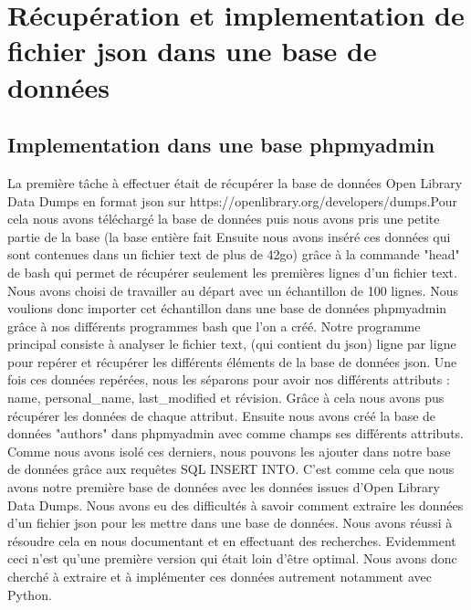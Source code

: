 \documentclass[12pt, a4paper]{article}
\begin{document}
\section{Récupération et implementation de fichier json dans une base de données}
\subsection{Implementation dans une base phpmyadmin}
La première tâche à effectuer était de récupérer la base de données Open Library Data Dumps en format json sur https://openlibrary.org/developers/dumps.Pour cela nous avons téléchargé la base de données puis nous avons pris une petite partie de la base (la base entière fait Ensuite nous avons inséré ces données qui sont contenues dans un fichier text de plus de 42go) grâce à la commande "head" de bash qui permet de récupérer seulement les premières lignes d'un fichier text. Nous avons choisi de travailler au départ avec un échantillon de 100 lignes. Nous voulions donc importer cet échantillon dans une base de données phpmyadmin grâce à nos différents programmes bash que l'on a créé.
Notre programme principal consiste à analyser le fichier text, (qui contient du json) ligne par ligne pour repérer et récupérer les différents éléments de la base de données json. Une fois ces données repérées, nous les séparons pour avoir nos différents attributs : name, personal\_name, last\_modified et révision. Grâce à cela nous avons pus récupérer les données de chaque attribut. Ensuite nous avons créé la base de données "authors" dans phpmyadmin avec comme champs ses différents attributs. Comme nous avons isolé ces derniers, nous pouvons les ajouter dans notre base de données grâce aux requêtes SQL INSERT INTO. C'est comme cela que nous avons notre première base de données avec les données issues d'Open Library Data Dumps.
Nous avons eu des difficultés à savoir comment extraire les données d'un fichier json pour les mettre dans une base de données. Nous avons réussi à résoudre cela en nous documentant et en effectuant des recherches.
Evidemment ceci n'est qu'une première version qui était loin d'être optimal. Nous avons donc cherché à extraire et à implémenter ces données autrement notamment avec Python.
\end{document}
